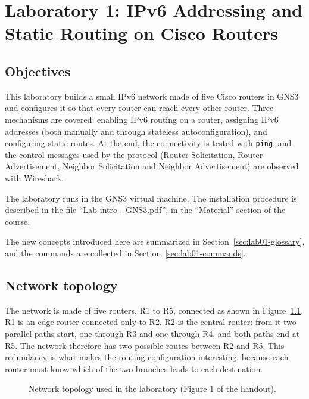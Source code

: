 \chapter{Laboratory 1: IPv6 Addressing and Static Routing on Cisco Routers}

\section{Objectives}

This laboratory builds a small IPv6 network made of five Cisco routers in GNS3 and configures it so that every router can reach every other router. Three mechanisms are covered: enabling IPv6 routing on a router, assigning IPv6 addresses (both manually and through stateless autoconfiguration), and configuring static routes. At the end, the connectivity is tested with \texttt{ping}, and the control messages used by the protocol (Router Solicitation, Router Advertisement, Neighbor Solicitation and Neighbor Advertisement) are observed with Wireshark.

The laboratory runs in the GNS3 virtual machine. The installation procedure is described in the file ``Lab intro - GNS3.pdf'', in the ``Material'' section of the course.

The new concepts introduced here are summarized in Section~\ref{sec:lab01-glossary}, and the commands are collected in Section~\ref{sec:lab01-commands}.

\section{Network topology}
\label{sec:lab01-topology}

The network is made of five routers, R1 to R5, connected as shown in Figure~\ref{fig:lab01-topology}. R1 is an edge router connected only to R2. R2 is the central router: from it two parallel paths start, one through R3 and one through R4, and both paths end at R5. The network therefore has two possible routes between R2 and R5. This redundancy is what makes the routing configuration interesting, because each router must know which of the two branches leads to each destination.

\begin{figure}[h]
\centering
{}
\caption{Network topology used in the laboratory (Figure 1 of the handout).}
\label{fig:lab01-topology}
\end{figure}

